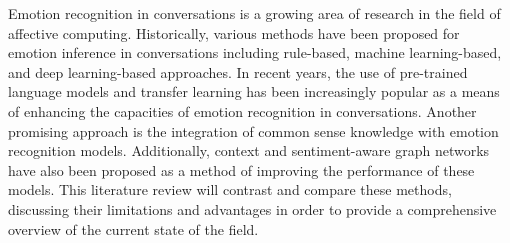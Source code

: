 Emotion recognition in conversations is a growing area of research in the field of affective computing. Historically, various methods have been proposed for emotion inference in conversations including rule-based, machine learning-based, and deep learning-based approaches. In recent years, the use of pre-trained language models and transfer learning has been increasingly popular as a means of enhancing the capacities of emotion recognition in conversations. Another promising approach is the integration of common sense knowledge with emotion recognition models. Additionally, context and sentiment-aware graph networks have also been proposed as a method of improving the performance of these models. This literature review will contrast and compare these methods, discussing their limitations and advantages in order to provide a comprehensive overview of the current state of the field.